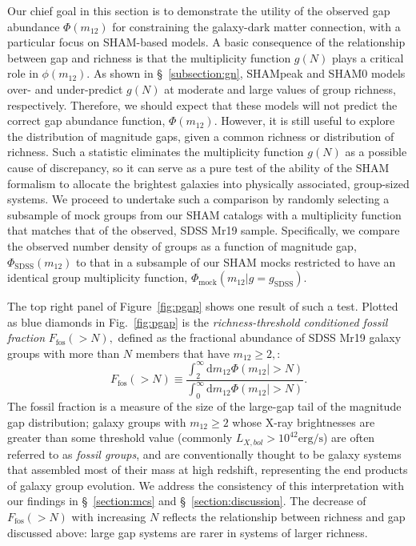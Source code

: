 \documentclass[usenatbib,usegraphicx,letterpaper]{mn2e}
\newcommand{\monetwo}{m_{12}}
\newcommand{\ffos}{F_{\mathrm{fos}}}
\newcommand{\dd}{\mathrm{d}}
\begin{document}
Our chief goal in this section is to demonstrate the utility of the 
observed gap abundance $\Phi(\monetwo)$ for constraining the galaxy-dark matter connection, 
with a particular focus on SHAM-based models. A basic consequence of the 
relationship between gap and richness is that the multiplicity function $g(N)$ 
plays a critical role in $\phi(\monetwo).$ 
As shown in \S~\ref{subsection:gn}, SHAMpeak and SHAM0 models 
over- and under-predict  $g(N)$ at moderate and large values of group richness, respectively.  
Therefore, we should expect that these models will not predict the correct gap abundance function, 
$\Phi(\monetwo).$ However, it is still useful to explore the distribution of 
magnitude gaps, given a common richness or distribution of richness.  Such 
a statistic eliminates the multiplicity function $g(N)$ as a possible cause 
of discrepancy, so it can serve as a pure test of the ability of the SHAM formalism 
to allocate the brightest galaxies into physically associated, group-sized systems.  
We proceed to undertake such a comparison by randomly selecting a subsample of 
mock groups from our SHAM catalogs with a multiplicity function that matches that 
of the observed, SDSS Mr19 sample.  Specifically, we compare the observed number density 
of groups as a function of magnitude gap, $\Phi_{\mathrm{SDSS}}(\monetwo)$ to that 
in a subsample of our SHAM mocks restricted to have an identical group multiplicity 
function, $\Phi_{\mathrm{mock}}(\monetwo|g=g_{\mathrm{SDSS}})$.  


The top right panel of Figure~\ref{fig:pgap} shows one result of such a 
test. Plotted as blue diamonds in Fig.~\ref{fig:pgap} is the {\em richness-threshold 
conditioned fossil fraction} $\ffos(>N),$ defined as the fractional abundance of 
SDSS Mr19 galaxy groups with more than $N$ members that have $\monetwo\geq2,$: 
%
\begin{equation}
\ffos(>N)\equiv\frac{\int_{2}^{\infty}\dd\monetwo\Phi(\monetwo|>N)}{\int_{0}^{\infty}\dd\monetwo\Phi(\monetwo|>N)}.
\end{equation}
%
The fossil fraction is a measure of the size of the large-gap tail of the 
magnitude gap distribution; 
galaxy groups with $\monetwo \geq 2$ whose X-ray brightnesses are 
greater than some threshold value (commonly $L_{X,bol}>10^{42}\mathrm{erg/s}$) 
are often referred to as {\em fossil groups}, and are conventionally thought 
to be galaxy systems that assembled most of their mass at high redshift, 
representing the end products of galaxy group evolution. 
We address the consistency of this interpretation with our findings 
in \S~\ref{section:mcs} and \S~\ref{section:discussion}. 
The decrease of $\ffos(>N)$ with increasing $N$ reflects the relationship 
between richness and gap discussed above: large gap systems are rarer in 
systems of larger richness.
\end{document}
